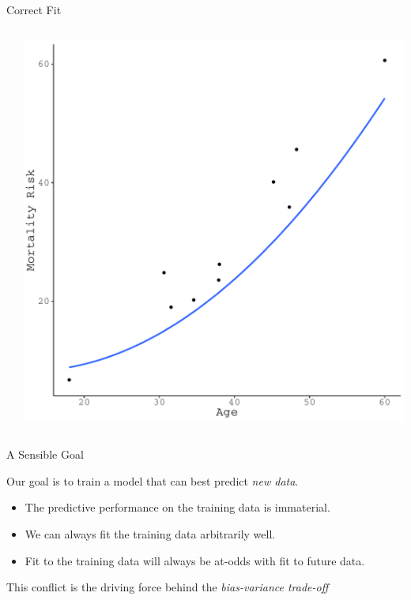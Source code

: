 \documentclass{beamer}\usepackage[]{graphicx}\usepackage[]{color}
\makeatletter
\def\maxwidth{ %
  \ifdim\Gin@nat@width>\linewidth
    \linewidth
  \else
    \Gin@nat@width
  \fi
}
\newenvironment{knitrout}{}{} %
\makeatother
\begin{document}
\begin{frame}{Correct Fit}
\begin{columns}
\begin{column}{0.5\textwidth}
\end{column}

\begin{column}{0.5\textwidth}
  
\begin{knitrout}\footnotesize
{}\color{fgcolor}

{\centering \includegraphics[width=\maxwidth]{figure/unnamed-chunk-17-1} 

}



\end{knitrout}

\end{column}
\end{columns}

\end{frame}

\watermarkon %

\begin{frame}{A Sensible Goal}
  
  Our goal is to train a model that can best predict \emph{new data}.
  \vc
  \begin{itemize}
  \item The predictive performance on the training data is immaterial.
  \item We can always fit the training data arbitrarily well.
  \item Fit to the training data will always be at-odds with fit to future data.
  \end{itemize}
  \vc
  This conflict is the driving force behind the \emph{bias-variance trade-off}

\end{frame}
\end{document}
